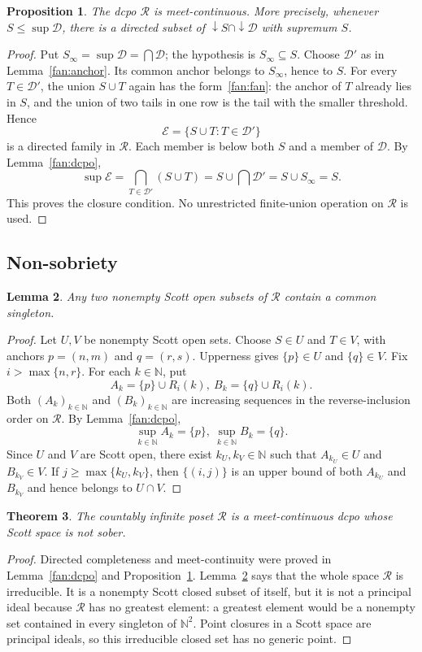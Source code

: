\documentclass[fleqn,preprint,3p,a4paper]{elsarticle}
\newtheorem{theorem}{Theorem}[section]
\newtheorem{lemma}[theorem]{Lemma}
\newtheorem{proposition}[theorem]{Proposition}
\theoremstyle{definition}
\newcommand{\N}{\mathbb N}
\newcommand{\RR}{\mathcal R}
\begin{document}
\begin{proposition}\label{fan:mc}
The dcpo $\RR$ is meet-continuous. More precisely, whenever $S\leq\sup\mathcal D$, there is a directed subset of ${\downarrow} S\cap{\downarrow}\mathcal D$ with supremum $S$.
\end{proposition}
\begin{proof}
Put $S_\infty=\sup\mathcal D=\bigcap\mathcal D$; the hypothesis is $S_\infty\subseteq S$. Choose $\mathcal D'$ as in Lemma~\ref{fan:anchor}. Its common anchor belongs to $S_\infty$, hence to $S$. For every $T\in\mathcal D'$, the union $S\cup T$ again has the form~\eqref{fan:fan}: the anchor of $T$ already lies in $S$, and the union of two tails in one row is the tail with the smaller threshold. Hence
\[
 \mathcal E=\{S\cup T:T\in\mathcal D'\}
\]
is a directed family in $\RR$. Each member is below both $S$ and a member of $\mathcal D$. By Lemma~\ref{fan:dcpo},
\[
 \sup\mathcal E
 =\bigcap_{T\in\mathcal D'}(S\cup T)
 =S\cup\bigcap\mathcal D'
 =S\cup S_\infty=S.
\]
This proves the closure condition. No unrestricted finite-union operation on $\RR$ is used.
\end{proof}

\subsection{Non-sobriety}
\begin{lemma}\label{fan:irr}
Any two nonempty Scott open subsets of $\RR$ contain a common singleton.
\end{lemma}
\begin{proof}
Let $U,V$ be nonempty Scott open sets. Choose $S\in U$ and $T\in V$, with anchors $p=(n,m)$ and $q=(r,s)$. Upperness gives $\{p\}\in U$ and $\{q\}\in V$. Fix $i>\max\{n,r\}$. For each $k\in\N$, put
\[
 A_k=\{p\}\cup R_i(k),
 ~
 B_k=\{q\}\cup R_i(k).
\]
Both $(A_k)_{k\in\N}$ and $(B_k)_{k\in\N}$ are increasing sequences in the reverse-inclusion order on $\RR$. By Lemma~\ref{fan:dcpo},
\[
 \sup_{k\in\N}A_k=\{p\},
 ~
 \sup_{k\in\N}B_k=\{q\}.
\]
Since $U$ and $V$ are Scott open, there exist $k_U,k_V\in\N$ such that $A_{k_U}\in U$ and $B_{k_V}\in V$. If $j\geq\max\{k_U,k_V\}$, then $\{(i,j)\}$ is an upper bound of both $A_{k_U}$ and $B_{k_V}$ and hence belongs to $U\cap V$.
\end{proof}

\begin{theorem}\label{fan:main}
The countably infinite poset $\RR$ is a meet-continuous dcpo whose Scott space is not sober.
\end{theorem}
\begin{proof}
Directed completeness and meet-continuity were proved in Lemma~\ref{fan:dcpo} and Proposition~\ref{fan:mc}. Lemma~\ref{fan:irr} says that the whole space $\RR$ is irreducible. It is a nonempty Scott closed subset of itself, but it is not a principal ideal because $\RR$ has no greatest element: a greatest element would be a nonempty set contained in every singleton of $\N^2$. Point closures in a Scott space are principal ideals, so this irreducible closed set has no generic point.
\end{proof}
\end{document}
